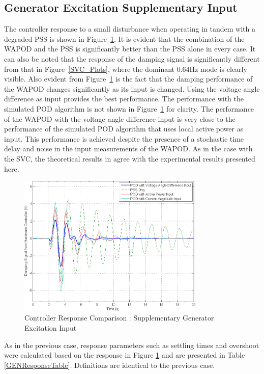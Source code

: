 \documentclass[journal]{IEEEtran}
\begin{document}
\subsection{Generator Excitation Supplementary Input}

The controller response to a small disturbance when operating in tandem with a degraded PSS is shown in Figure~\ref{Generator_Plots}. It is evident that the combination of the WAPOD and the PSS is significantly better than the PSS alone in every case. It can also be noted that the response of the damping signal is significantly different from that in Figure~\ref{SVC_Plots}, where the dominant 0.64Hz mode is clearly visible. Also evident from Figure~\ref{Generator_Plots} is the fact that the damping performance of the WAPOD changes significantly as its input is changed. Using the voltage angle difference as input provides the best performance. The performance with the simulated POD algorithm is not shown in Figure~\ref{Generator_Plots} for clarity. The performance of the WAPOD with the voltage angle difference input is very close to the performance of the simulated POD algorithm that uses local active power as input. This performance is achieved despite the presence of a stochastic time delay and noise in the input measurements of the WAPOD. As in the case with the SVC, the theoretical results in \cite{Yuwa} agree with the experimental results presented here.

\begin{figure}[!th]
\centering
\includegraphics[width=3.5in]{Wide_Area_ResponseComparison_SamePlot.png}
\caption{Controller Response Comparison : Supplementary Generator Excitation Input}
\label{Generator_Plots}
\end{figure}

As in the previous case, response parameters such as settling times and overshoot were calculated based on the response in Figure \ref{Generator_Plots} and are presented in Table \ref{GENResponseTable}. Definitions are identical to the previous case.\\
\end{document}
